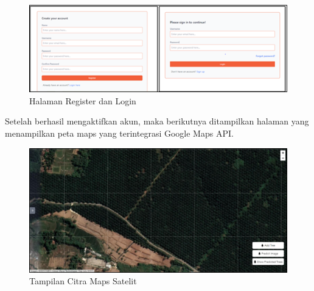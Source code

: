 \begin{figure}[H]
	\vspace{-0.1cm}
	\begin{center}
		\includegraphics[width=1\columnwidth]{bab4/Gambar/Picture34.png}
	\end{center}
	\vspace{-0.2cm}
	\captionsetup{justification=centering}
	\caption{Halaman Register dan Login}\label{img:Halaman-Register-dan-Login}
\end{figure}

Setelah berhasil mengaktifkan akun, maka berikutnya ditampilkan halaman yang menampilkan peta maps yang terintegrasi Google Maps API.

\begin{figure}[H]
	\vspace{-0.1cm}
	\begin{center}
		\includegraphics[width=1\columnwidth]{bab4/Gambar/Picture35.png}
	\end{center}
	\vspace{-0.2cm}
	\captionsetup{justification=centering}
	\caption{Tampilan Citra Maps Satelit}\label{img:Tampilan-Citra-Maps-Satelit}
\end{figure}

